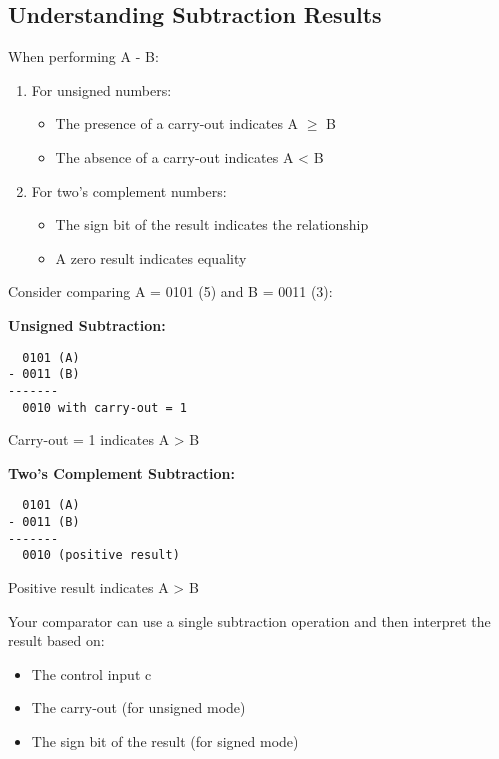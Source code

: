 \documentclass[12pt]{labmanual}
\begin{document}
\subsection{Understanding Subtraction Results}

When performing A - B:
\begin{enumerate}
    \item For unsigned numbers:
    \begin{itemize}
        \item The presence of a carry-out indicates A $\geq$ B
        \item The absence of a carry-out indicates A < B
    \end{itemize}
    \item For two's complement numbers:
    \begin{itemize}
        \item The sign bit of the result indicates the relationship
        \item A zero result indicates equality
    \end{itemize}
\end{enumerate}

\begin{extra}[frametitle={Implementation Example}]
Consider comparing A = 0101 (5) and B = 0011 (3):

\textbf{Unsigned Subtraction:}
\begin{verbatim}
  0101 (A)
- 0011 (B)
-------
  0010 with carry-out = 1
\end{verbatim}
Carry-out = 1 indicates A > B

\textbf{Two's Complement Subtraction:}
\begin{verbatim}
  0101 (A)
- 0011 (B)
-------
  0010 (positive result)
\end{verbatim}
Positive result indicates A > B
\end{extra}

\begin{important}[frametitle={Design Consideration}]
Your comparator can use a single subtraction operation and then interpret the result based on:
\begin{itemize}
    \item The control input c
    \item The carry-out (for unsigned mode)
    \item The sign bit of the result (for signed mode)
\end{itemize}
\end{important}
\end{document}
